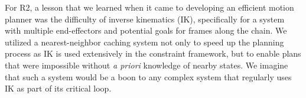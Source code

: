 For R2, a lesson that we learned when it came to developing an efficient motion planner was the difficulty of inverse kinematics (IK), specifically for a system with multiple end-effectors and potential goals for frames along the chain.
We utilized a nearest-neighbor caching system not only to speed up the planning process as IK is used extensively in the constraint framework, but to enable plans that were impossible without \emph{a priori} knowledge of nearby states.
We imagine that such a system would be a boon to any complex system that regularly uses IK as part of its critical loop.







